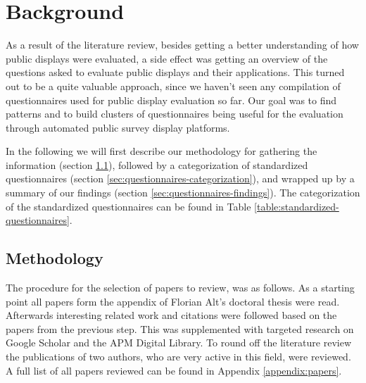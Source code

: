 \section{Background}
\label{sec:questionnaires}


As a result of the literature review, besides getting a better understanding of how public displays were evaluated, a side effect was getting an overview of the questions asked to evaluate public displays and their applications. This turned out to be a quite valuable approach, since we haven't seen any compilation of questionnaires used for public display evaluation so far. Our goal was to find patterns and to build clusters of questionnaires being useful for the evaluation through automated public survey display platforms.

In the following we will first describe our methodology for gathering the information (section \ref{sec:questionnaires-methodology}), followed by a categorization of standardized questionnaires (section \ref{sec:questionnaires-categorization}), and wrapped up by a summary of our findings (section \ref{sec:questionnaires-findings}). The categorization of the standardized questionnaires can be found in Table \ref{table:standardized-questionnaires}.





\subsection{Methodology}
\label{sec:questionnaires-methodology}

	The procedure for the selection of papers to review, was as follows. As a starting point all papers form the appendix of Florian Alt's doctoral thesis \cite{alt2013thesis} were read. Afterwards interesting related work and citations were followed based on the papers from the previous step. This was supplemented with targeted research on Google Scholar and the APM Digital Library. To round off the literature review the publications of two authors, who are very active in this field, were reviewed. A full list of all papers reviewed can be found in Appendix \ref{appendix:papers}.

